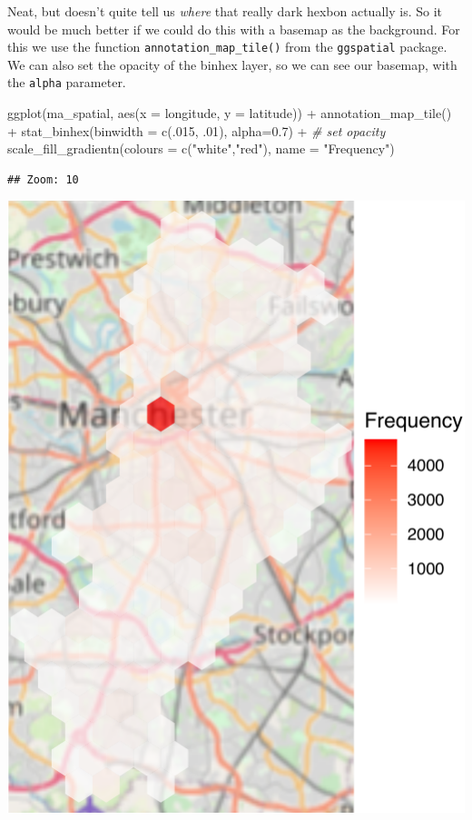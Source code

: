 \documentclass[
]{book}
\newenvironment{Shaded}{\begin{snugshade}}{\end{snugshade}}
\newcommand{\AttributeTok}[1]{\textcolor[rgb]{0.77,0.63,0.00}{#1}}
\newcommand{\CommentTok}[1]{\textcolor[rgb]{0.56,0.35,0.01}{\textit{#1}}}
\newcommand{\DecValTok}[1]{\textcolor[rgb]{0.00,0.00,0.81}{#1}}
\newcommand{\FloatTok}[1]{\textcolor[rgb]{0.00,0.00,0.81}{#1}}
\newcommand{\FunctionTok}[1]{\textcolor[rgb]{0.00,0.00,0.00}{#1}}
\newcommand{\NormalTok}[1]{#1}
\newcommand{\SpecialCharTok}[1]{\textcolor[rgb]{0.00,0.00,0.00}{#1}}
\newcommand{\StringTok}[1]{\textcolor[rgb]{0.31,0.60,0.02}{#1}}
\begin{document}
Neat, but doesn't quite tell us \emph{where} that really dark hexbon actually is. So it would be much better if we could do this with a basemap as the background. For this we use the function \texttt{annotation\_map\_tile()} from the \texttt{ggspatial} package. We can also set the opacity of the binhex layer, so we can see our basemap, with the \texttt{alpha} parameter.

\begin{Shaded}
\begin{Highlighting}[]
\FunctionTok{ggplot}\NormalTok{(ma\_spatial, }\FunctionTok{aes}\NormalTok{(}\AttributeTok{x =}\NormalTok{ longitude, }\AttributeTok{y =}\NormalTok{ latitude)) }\SpecialCharTok{+}
  \FunctionTok{annotation\_map\_tile}\NormalTok{() }\SpecialCharTok{+} 
  \FunctionTok{stat\_binhex}\NormalTok{(}\AttributeTok{binwidth =} \FunctionTok{c}\NormalTok{(.}\DecValTok{015}\NormalTok{, .}\DecValTok{01}\NormalTok{), }\AttributeTok{alpha=}\FloatTok{0.7}\NormalTok{) }\SpecialCharTok{+}   \CommentTok{\# set opacity                                              }
  \FunctionTok{scale\_fill\_gradientn}\NormalTok{(}\AttributeTok{colours =} \FunctionTok{c}\NormalTok{(}\StringTok{"white"}\NormalTok{,}\StringTok{"red"}\NormalTok{), }
                       \AttributeTok{name =} \StringTok{"Frequency"}\NormalTok{)    }
\end{Highlighting}
\end{Shaded}

\begin{verbatim}
## Zoom: 10
\end{verbatim}

\includegraphics{crime_mapping_files/figure-latex/unnamed-chunk-126-1.pdf}
\end{document}
